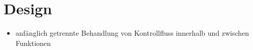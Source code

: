 \section{Design}

\begin{leftbar}
  \begin{itemize}
    \item anfänglich getrennte Behandlung von Kontrollfluss innerhalb und
        zwischen Funktionen
  \end{itemize}
\end{leftbar}
